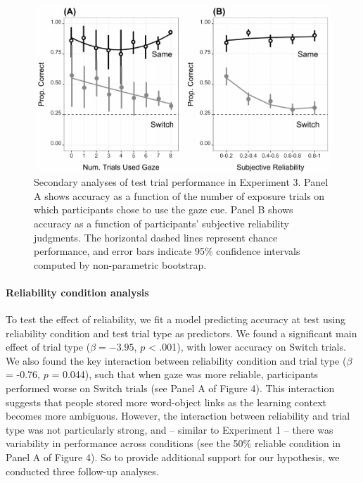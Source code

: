 \documentclass[authoryear, review]{elsarticle}
\newenvironment{CodeChunk}{}{}
\begin{document}
\begin{CodeChunk}
\begin{figure}[tb]

{\centering \includegraphics[width=0.9\linewidth]{figs/expt3-sub-plots-1} 

}

\caption[Secondary analyses of test trial performance in Experiment 3]{Secondary analyses of test trial performance in Experiment 3. Panel A shows accuracy as a function of the number of exposure trials on which participants chose to use the gaze cue. Panel B shows accuracy as a function of participants' subjective reliability judgments. The horizontal dashed lines represent chance performance, and error bars indicate 95\% confidence intervals computed by non-parametric bootstrap.}\label{fig:expt3-sub-plots}
\end{figure}
\end{CodeChunk}

\paragraph{Reliability condition
analysis}\label{reliability-condition-analysis}

To test the effect of reliability, we fit a model predicting accuracy at
test using reliability condition and test trial type as predictors. We
found a significant main effect of trial type (\(\beta = -3.95\), \(p\)
\textless{} .001), with lower accuracy on Switch trials. We also found
the key interaction between reliability condition and trial type
(\(\beta\) = -0.76, \(p\) = 0.044), such that when gaze was more
reliable, participants performed worse on Switch trials (see Panel A of
Figure 4). This interaction suggests that people stored more word-object
links as the learning context becomes more ambiguous. However, the
interaction between reliability and trial type was not particularly
strong, and -- similar to Experiment 1 -- there was variability in
performance across conditions (see the 50\% reliable condition in Panel
A of Figure 4). So to provide additional support for our hypothesis, we
conducted three follow-up analyses.
\end{document}
